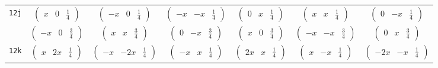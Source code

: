 \documentclass[fleqn,9pt,landscape]{jsarticle}
\begin{document}
\begin{center}
\begin{longtable}{ccccccc}
{\tt 12j} & $ \begin{pmatrix} x & 0 & \frac{1}{4} \end{pmatrix} $ & $ \begin{pmatrix} - x & 0 & \frac{1}{4} \end{pmatrix} $ & $ \begin{pmatrix} - x & - x & \frac{1}{4} \end{pmatrix} $ & $ \begin{pmatrix} 0 & x & \frac{1}{4} \end{pmatrix} $ & $ \begin{pmatrix} x & x & \frac{1}{4} \end{pmatrix} $ & $ \begin{pmatrix} 0 & - x & \frac{1}{4} \end{pmatrix} $ \\
& $ \begin{pmatrix} - x & 0 & \frac{3}{4} \end{pmatrix} $ & $ \begin{pmatrix} x & x & \frac{3}{4} \end{pmatrix} $ & $ \begin{pmatrix} 0 & - x & \frac{3}{4} \end{pmatrix} $ & $ \begin{pmatrix} x & 0 & \frac{3}{4} \end{pmatrix} $ & $ \begin{pmatrix} - x & - x & \frac{3}{4} \end{pmatrix} $ & $ \begin{pmatrix} 0 & x & \frac{3}{4} \end{pmatrix} $ \\ \hline
{\tt 12k} & $ \begin{pmatrix} x & 2 x & \frac{1}{4} \end{pmatrix} $ & $ \begin{pmatrix} - x & - 2 x & \frac{1}{4} \end{pmatrix} $ & $ \begin{pmatrix} - x & x & \frac{1}{4} \end{pmatrix} $ & $ \begin{pmatrix} 2 x & x & \frac{1}{4} \end{pmatrix} $ & $ \begin{pmatrix} x & - x & \frac{1}{4} \end{pmatrix} $ & $ \begin{pmatrix} - 2 x & - x & \frac{1}{4} \end{pmatrix} $ \\

\end{longtable}
\end{center}
\end{document}
